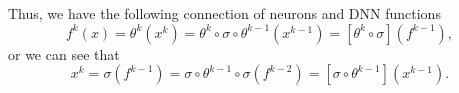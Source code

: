 Thus, we have the following connection of neurons and DNN functions
$$
f^k(x) = \theta^{k}(x^k) = \theta^{k} \circ \sigma \circ \theta^{k-1}(x^{k-1}) = [\theta^{k} \circ \sigma ] (f^{k-1}),
$$
or we can see that
$$
x^k = \sigma(f^{k-1}) = \sigma \circ \theta^{k-1} \circ \sigma (f^{k-2}) = [\sigma \circ \theta^{k-1}] (x^{k-1}).
$$
%	
